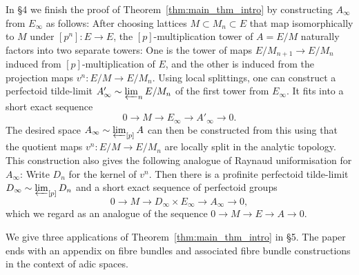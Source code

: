 \documentclass[10pt,oneside]{amsart}
\theoremstyle{definition}
\newtheorem{question}[theorem]{Question}
\newtheorem{example}[theorem]{Example}
\begin{document}
In \S4 we finish the proof of Theorem~\ref{thm:main_thm_intro} by constructing $A_\infty$ from $E_\infty$ as follows: After choosing lattices $M\subset M_n\subset E$ that map isomorphically to $M$ under $[p^n]\colon E\rightarrow E$, the $[p]$-multiplication tower of $A=E/M$ naturally factors into two separate towers: One is the tower of maps $E/M_{n+1}\rightarrow E/M_n$ induced from $[p]$-multiplication of $E$, and the other is induced from the projection maps $v^n\colon E/M\rightarrow E/M_n$. Using local splittings, one can construct a perfectoid tilde-limit $A'_\infty\sim \varprojlim_n E/M_n$ of the first tower from $E_\infty$. It fits into a short exact sequence
\[0\to M\to E_\infty\to A'_\infty\to 0. \]
 The desired space $A_\infty\sim \varprojlim_{[p]}A$ can then be constructed from this using that the quotient maps $v^n\colon E/M\rightarrow E/M_n$ are locally split in the analytic topology. This construction also gives the following analogue of Raynaud uniformisation for $A_\infty$: Write $D_n$ for the kernel of $v^n$. Then there is a profinite perfectoid tilde-limit $D_\infty\sim \varprojlim_{[p]} D_n$ and a short exact sequence of perfectoid groups
\[0\rightarrow M\rightarrow D_\infty \times E_\infty \rightarrow A_\infty\rightarrow 0,\]
which we regard as an analogue of the sequence $0\rightarrow M\rightarrow E\rightarrow A\rightarrow 0$.

We give three applications of Theorem~\ref{thm:main_thm_intro} in \S 5. The paper ends with an appendix on fibre bundles and associated fibre bundle constructions in the context of adic spaces.

 \begin{comment}
Now we end the introduction by describing the content of each section. 

	\begin{question} \label{question_intro}
	    \begin{enumerate} 
	    \item		Given a rigid group $G$, when is there an adic space $G_\infty$ such that $G_\infty \sim  \varprojlim_{[p]} G ?$
	    \item If it exists, and $K$ is perfectoid, when is $G_\infty$ perfectoid?
	    \end{enumerate}
	\end{question}
 
 
	But before we give proofs for examples of rigid groups $G$ for which a perfectoid tilde-limit exists, we first note that the second question certainly doesn't have an affirmative answer for all rigid group varieties:
	\begin{example}
		For the additive group $\mathbb G_a^{\operatorname{an}}$, we know that $[p]$ is an isomorphism and therefore $\varprojlim_{[p]} \mathbb G_a=\mathbb G_a$ exists (even as an actual limit in the category of adic spaces) but is certainly not perfectoid.
	\end{example}

\end{comment} 
 
\end{document}

